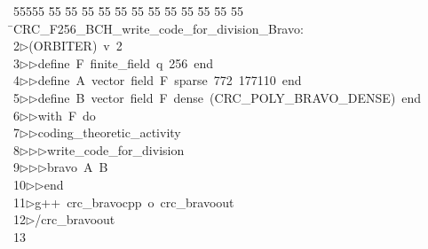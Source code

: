 %
%
\begin{tabbing}
55555 \= 55 \= 55 \= 55 \= 55 \= 55 \= 55 \= 55 \= 55 \= 55 \= 55 \= 55 \= 55 \= \>CRC\_F256\_BCH\_write\_code\_for\_division\_Bravo:\\[0pt]
2\>$\triangleright$\>(ORBITER)\ v\ 2\ \\[0pt]
3\>$\triangleright$\>$\triangleright$\>define\ F\ finite\_field\ q\ 256\ end\ \\[0pt]
4\>$\triangleright$\>$\triangleright$\>define\ A\ vector\ field\ F\ sparse\ 772\ 177110\ end\ \\[0pt]
5\>$\triangleright$\>$\triangleright$\>define\ B\ vector\ field\ F\ dense\ (CRC\_POLY\_BRAVO\_DENSE)\ end\ \\[0pt]
6\>$\triangleright$\>$\triangleright$\>with\ F\ do\ \\[0pt]
7\>$\triangleright$\>$\triangleright$\>coding\_theoretic\_activity\ \\[0pt]
8\>$\triangleright$\>$\triangleright$\>$\triangleright$\>write\_code\_for\_division\ \\[0pt]
9\>$\triangleright$\>$\triangleright$\>$\triangleright$\>bravo\ A\ B\ \\[0pt]
10\>$\triangleright$\>$\triangleright$\>end\\[0pt]
11\>$\triangleright$\>g++\ crc\_bravocpp\ o\ crc\_bravoout\\[0pt]
12\>$\triangleright$\>/crc\_bravoout\\[0pt]
13\>\end{tabbing}
